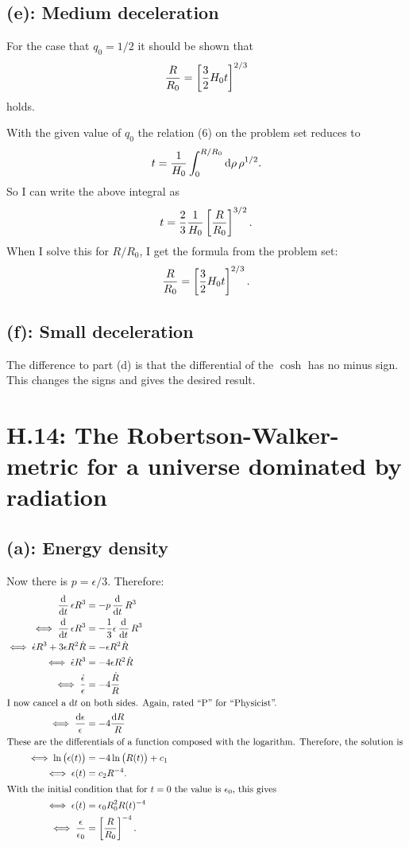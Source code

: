 \subsection*{(e): Medium deceleration}

For the case that $q_0 = 1/2$ it should be shown that
\[
    \frac{R}{R_0} = \sbr{\frac 32 H_0 t}^{2/3}
\]
holds.

With the given value of $q_0$ the relation (6) on the problem set reduces to
\[
    t = \frac{1}{H_0} \int_0^{R/R_0} \dif \rho \, \rho^{1/2}.
\]
So I can write the above integral as
\[
    t = \frac23 \frac{1}{H_0} \sbr{\frac{R}{R_0}}^{3/2}.
\]
When I solve this for $R/R_0$, I get the formula from the problem set:
\[
    \frac{R}{R_0} = \sbr{\frac 32 H_0t}^{2/3}.
\]

\subsection*{(f): Small deceleration}

The difference to part (d) is that the differential of the $\cosh$ has no minus
sign. This changes the signs and gives the desired result.

\section*{H.14: The Robertson-Walker-metric for a universe dominated by
radiation}

\subsection*{(a): Energy density}

Now there is $p = \epsilon/3$. Therefore:
\begin{align*}
    \dod{}t \epsilon R^3 &= - p \dod{}t R^3 \\
    \iff \dod{}t \epsilon R^3 &= - \frac13 \epsilon \dod{}t R^3 \\
    \iff \dot \epsilon R^3 + 3 \epsilon R^2 \dot R &= - \epsilon R^2 \dot R \\
    \iff \dot \epsilon R^3 &= - 4 \epsilon R^2 \dot R \\
    \iff \frac{\dot\epsilon}{\epsilon} &= -4 \frac{\dot R}{R} \\
    \intertext{%
        I now cancel a $\dif t$ on both sides. Again, rated “P” for
        “Physicist”.
    }
    \iff \frac{\dif\epsilon}{\epsilon} &= -4 \frac{\dif R}{R} \\
    \intertext{%
        These are the differentials of a function composed with the logarithm.
        Therefore, the solution is
    }
    \iff \ln\del{\epsilon(t)} &= -4 \ln\del{R(t)} + c_1 \\
    \iff \epsilon(t) &= c_2 R^{-4}. \\
    \intertext{%
        With the initial condition that for $t = 0$ the value is $\epsilon_0$,
        this gives
    }
    \iff \epsilon(t) &= \epsilon_0 R_0^2 R(t)^{-4} \\
    \iff \frac{\epsilon}{\epsilon_0} &= \sbr{\frac{R}{R_0}}^{-4}.
\end{align*}

